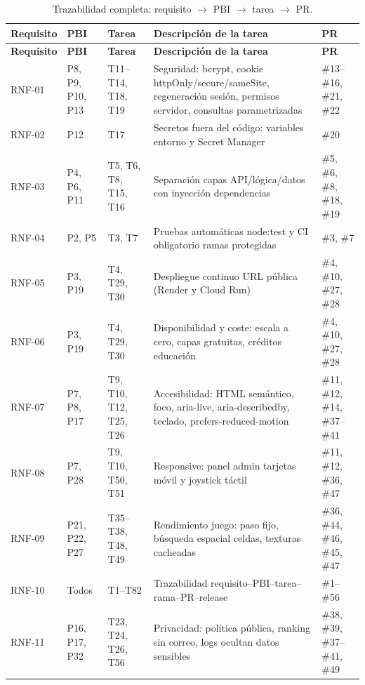 {\small
\begin{longtable}{@{}L{1.5cm} L{0.8cm} L{1.3cm} L{7.0cm} L{2.9cm}@{}}
\caption{Trazabilidad completa: requisito $\rightarrow$ PBI $\rightarrow$ tarea $\rightarrow$ PR.}\label{tab:trazabilidad-completa}\\
\toprule
\textbf{Requisito} & \textbf{PBI} & \textbf{Tarea} & \textbf{Descripción de la tarea} & \textbf{PR} \\ \midrule \endfirsthead
\toprule
\textbf{Requisito} & \textbf{PBI} & \textbf{Tarea} & \textbf{Descripción de la tarea} & \textbf{PR} \\ \midrule \endhead
RNF-01 & P8, P9, P10, P13 & T11--\allowbreak T14, T18, T19 & Seguridad: bcrypt, cookie httpOnly/secure/sameSite, regeneración sesión, permisos servidor, consultas parametrizadas & \#13--\#16, \#21, \#22 \\
RNF-02 & P12 & T17 & Secretos fuera del código: variables entorno y Secret Manager & \#20 \\
RNF-03 & P4, P6, P11 & T5, T6, T8, T15, T16 & Separación capas API/lógica/datos con inyección dependencias & \#5, \#6, \#8, \#18, \#19 \\
RNF-04 & P2, P5 & T3, T7 & Pruebas automáticas node:test y CI obligatorio ramas protegidas & \#3, \#7 \\
RNF-05 & P3, P19 & T4, T29, T30 & Despliegue continuo URL pública (Render y Cloud Run) & \#4, \#10, \#27, \#28 \\
RNF-06 & P3, P19 & T4, T29, T30 & Disponibilidad y coste: escala a cero, capas gratuitas, créditos educación & \#4, \#10, \#27, \#28 \\
RNF-07 & P7, P8, P17 & T9, T10, T12, T25, T26 & Accesibilidad: HTML semántico, foco, aria-live, aria-describedby, teclado, prefers-reduced-motion & \#11, \#12, \#14, \#37--\#41 \\
RNF-08 & P7, P28 & T9, T10, T50, T51 & Responsive: panel admin tarjetas móvil y joystick táctil & \#11, \#12, \#36, \#47 \\
RNF-09 & P21, P22, P27 & T35--\allowbreak T38, T48, T49 & Rendimiento juego: paso fijo, búsqueda espacial celdas, texturas cacheadas & \#36, \#44, \#46, \#45, \#47 \\
RNF-10 & Todos & T1--\allowbreak T82 & Trazabilidad requisito--\allowbreak PBI--\allowbreak tarea--\allowbreak rama--\allowbreak PR--\allowbreak release & \#1--\#56 \\
RNF-11 & P16, P17, P32 & T23, T24, T26, T56 & Privacidad: política pública, ranking sin correo, logs ocultan datos sensibles & \#38, \#39, \#37--\#41, \#49 \\

\end{longtable}}

